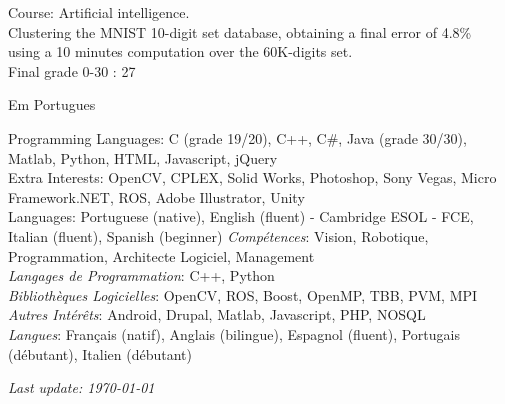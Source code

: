 \documentclass{article}
\begin{document}
\begin{llist}
{ 
Course: Artificial intelligence.\\
Clustering the MNIST 10-digit set database, obtaining a final error of 4.8\%\\
using a 10 minutes computation over the 60K-digits set.\\
Final grade 0-30 : 27

}
{

Em Portugues

}

{
Programming Languages: C (grade 19/20), C++, C\#, Java (grade 30/30), Matlab, Python, HTML, Javascript, jQuery\\
Extra Interests: OpenCV, CPLEX, Solid Works, Photoshop, Sony Vegas, Micro Framework.NET, ROS, Adobe Illustrator, Unity\\
Languages: Portuguese (native), English (fluent) - Cambridge ESOL - FCE, Italian (fluent), Spanish (beginner)
}
{
{\em Comp\'{e}tences}: Vision, Robotique, Programmation, Architecte Logiciel, Management\\
{\em Langages de Programmation}: C++, Python\\
{\em Biblioth\`{e}ques Logicielles}: OpenCV, ROS, Boost, OpenMP, TBB, PVM, MPI \\
{\em Autres Int\'{e}r\^{e}ts}: Android, Drupal, Matlab, Javascript, PHP, NOSQL \\
{\em Langues}: Fran\c{c}ais (natif), Anglais (bilingue), Espagnol (fluent), Portugais (d\'{e}butant), Italien
(d\'{e}butant)
}




\end{llist}

{\em Last update: \today}
\end{document}
